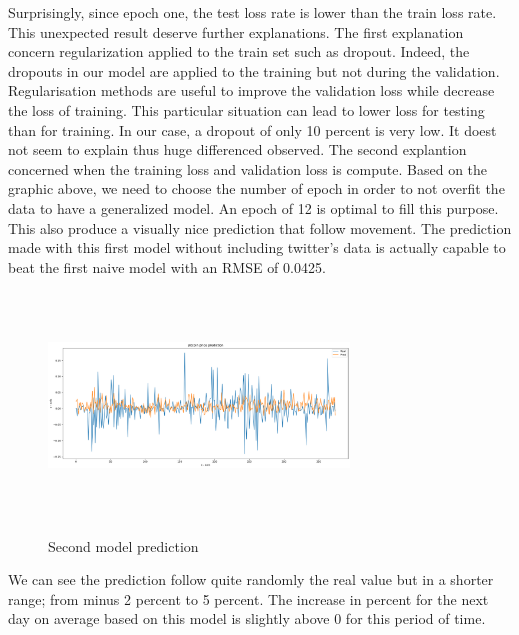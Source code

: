 \documentclass[conference]{IEEEtran}
\begin{document}
Surprisingly, since epoch one, the test loss rate is lower than the train loss rate. This unexpected result deserve further explanations. \newline
\newline
The first explanation concern regularization applied to the train set such as dropout. Indeed, the dropouts in our model are applied to the training but not during the validation. Regularisation methods are useful to improve the validation loss while decrease the loss of training. This particular situation can lead to lower loss for testing than for training. 
In our case, a dropout of only 10 percent is very low. It doest not seem to explain thus huge differenced observed. \newline
The second explantion concerned when the training loss and validation loss is compute. \newline
\newline Based on the graphic above, we need to choose the number of epoch in order to not overfit the data to have a generalized model. An epoch of 12 is optimal to fill this purpose. This also produce a visually nice prediction that follow movement.\newline
\newline The prediction made with this first model without including twitter's data is actually capable to beat the first naive model with an RMSE of 0.0425.

\begin{figure}[H]
\includegraphics[width=8cm, height=6cm]{M1_FInal}
	\label{fig}
	\caption{Second model prediction}
\end{figure}

We can see the prediction follow quite randomly the real value but in a shorter range; from minus 2 percent to 5 percent. The increase in percent for the next day on average based on this model is slightly above 0 for this period of time. 
\end{document}
